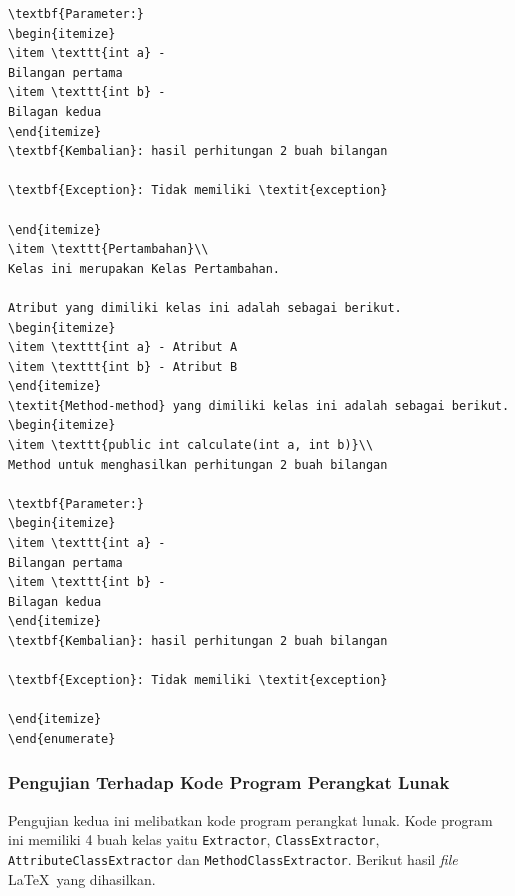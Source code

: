 \documentclass[a4paper,twoside]{article}
\begin{document}
\begin{enumerate}
\begin{lstlisting}[caption=Hasil Pengujian Pertama]
\textbf{Parameter:}
\begin{itemize}
\item \texttt{int a} - 
Bilangan pertama
\item \texttt{int b} - 
Bilagan kedua
\end{itemize}
\textbf{Kembalian}: hasil perhitungan 2 buah bilangan

\textbf{Exception}: Tidak memiliki \textit{exception}

\end{itemize}
\item \texttt{Pertambahan}\\ 
Kelas ini merupakan Kelas Pertambahan.

Atribut yang dimiliki kelas ini adalah sebagai berikut.
\begin{itemize}
\item \texttt{int a} - Atribut A
\item \texttt{int b} - Atribut B
\end{itemize}
\textit{Method-method} yang dimiliki kelas ini adalah sebagai berikut.
\begin{itemize}
\item \texttt{public int calculate(int a, int b)}\\ 
Method untuk menghasilkan perhitungan 2 buah bilangan

\textbf{Parameter:}
\begin{itemize}
\item \texttt{int a} - 
Bilangan pertama
\item \texttt{int b} - 
Bilagan kedua
\end{itemize}
\textbf{Kembalian}: hasil perhitungan 2 buah bilangan

\textbf{Exception}: Tidak memiliki \textit{exception}

\end{itemize}
\end{enumerate}

\end{lstlisting}

\subsubsection{Pengujian Terhadap Kode Program Perangkat Lunak}
\label{sec:pengujian perangkat lunak}
Pengujian kedua ini melibatkan kode program perangkat lunak. Kode program ini memiliki 4 buah kelas yaitu \texttt{Extractor}, \texttt{ClassExtractor}, \texttt{AttributeClassExtractor} dan \texttt{MethodClassExtractor}. Berikut hasil {\it file} \LaTeX\ yang dihasilkan.


\end{enumerate}
\end{document}
